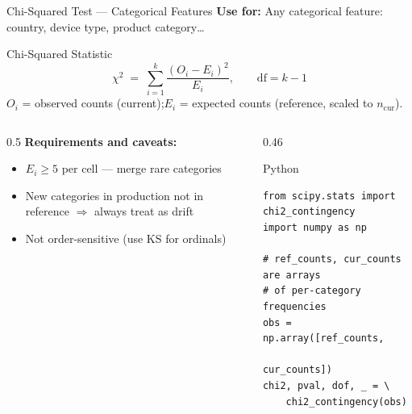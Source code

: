 \documentclass[10pt,aspectratio=169]{beamer}
\begin{document}
\begin{frame}[fragile]{Chi-Squared Test --- Categorical Features}
  \textbf{Use for:} Any categorical feature: country, device type, product category\ldots
  \vspace{0.15cm}
  \begin{block}{Chi-Squared Statistic}
    \[
      \chi^2 \;=\; \sum_{i=1}^{k}\frac{(O_i - E_i)^2}{E_i}, \qquad \mathrm{df} = k-1
    \]
    $O_i$ = observed counts (current);\quad $E_i$ = expected counts (reference, scaled to $n_{\mathrm{cur}}$).
  \end{block}
  \vspace{0.15cm}
  \begin{columns}[T]
    \begin{column}{0.5\textwidth}
      \textbf{Requirements and caveats:}
      \begin{itemize}
        \item $E_i \geq 5$ per cell --- merge rare categories
        \item New categories in production not in reference $\Rightarrow$ always treat as drift
        \item Not order-sensitive (use KS for ordinals)
      \end{itemize}
    \end{column}
    \begin{column}{0.46\textwidth}
      \begin{exampleblock}{Python}
        \begin{lstlisting}[style=pycode]
from scipy.stats import chi2_contingency
import numpy as np

# ref_counts, cur_counts are arrays
# of per-category frequencies
obs = np.array([ref_counts,
                cur_counts])
chi2, pval, dof, _ = \
    chi2_contingency(obs)
        \end{lstlisting}
      \end{exampleblock}
    \end{column}
  \end{columns}
\end{frame}
\end{document}
